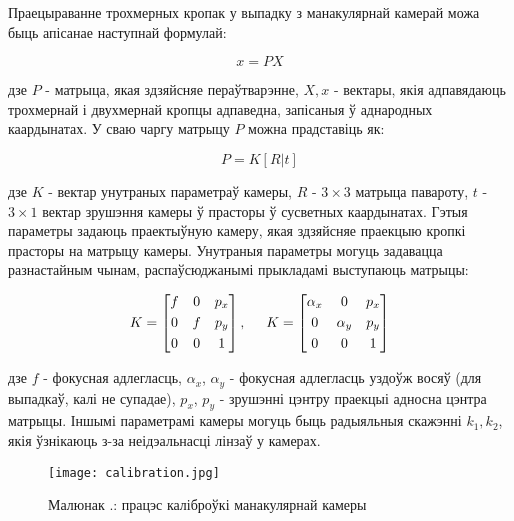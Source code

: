 Праецыраванне трохмерных кропак у выпадку з манакулярнай камерай можа быць апісанае наступнай формулай:

\begin{equation}
  x = PX
\end{equation}

\vspace{4mm}

дзе $P$ - матрыца, якая здзяйсняе пераўтварэнне, $X, x$ - вектары, якія адпавядаюць
трохмернай і двухмернай кропцы адпаведна, запісаныя ў аднародных каардынатах.
У сваю чаргу матрыцу $P$ можна прадставіць як:

\begin{equation} \label{eq:transform-matrix}
  P = K[R|t]
\end{equation}

\vspace{4mm}

дзе $K$ - вектар унутраных параметраў камеры, $R$ - $3 \times 3$ матрыца павароту, $t$ - $3 \times 1$ вектар
зрушэння камеры ў прасторы ў сусветных каардынатах. Гэтыя параметры задаюць праектыўную
камеру, якая здзяйсняе праекцыю кропкі прасторы на матрыцу камеры. Унутраныя параметры могуць
задавацца разнастайным чынам, распаўсюджанымі прыкладамі выступаюць матрыцы:

\begin{equation}
  K = \begin{bmatrix}
    f & 0 & p_x \\[0.3em]
    0 & f & p_y \\[0.3em]
    0 & 0 & 1
  \end{bmatrix},
  \hspace{5mm}
  K = \begin{bmatrix}
    \alpha_x & 0 & p_x \\[0.3em]
    0 & \alpha_y & p_y \\[0.3em]
    0 & 0 & 1
  \end{bmatrix}
\end{equation}

\vspace{4mm}

дзе $f$ - фокусная адлегласць, $\alpha_x$, $\alpha_y$ - фокусная адлегласць уздоўж восяў
(для выпадкаў, калі не супадае), $p_x$, $p_y$ - зрушэнні цэнтру праекцыі адносна цэнтра матрыцы.
Іншымі параметрамі камеры могуць быць радыяльныя скажэнні $k_1, k_2$, якія ўзнікаюць з-за неідэальнасці
лінзаў у камерах.

\begin{figure}[h]
    \centering
    \texttt{[image: calibration.jpg]}
    \captionsetup{labelformat=empty}
    \caption{Малюнак \cursection.: працэс каліброўкі манакулярнай камеры}
    \label{fig:calibration}
\end{figure}


